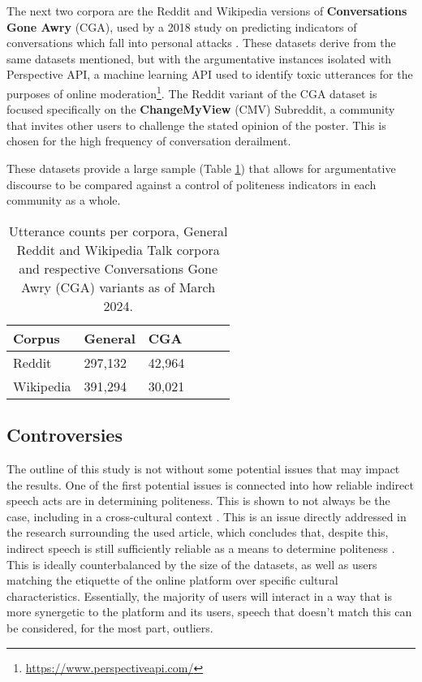 \documentclass{article}
\begin{document}
The next two corpora are the Reddit and Wikipedia versions of \textbf{Conversations Gone Awry} (CGA), used by a 2018 study on predicting indicators of conversations which fall into personal attacks \cite{CGA}. These datasets derive from the same datasets mentioned, but with the argumentative instances isolated with Perspective API, a machine learning API used to identify toxic utterances for the purposes of online moderation\footnote{\url{https://www.perspectiveapi.com/}}. The Reddit variant of the CGA dataset is focused specifically on the \textbf{ChangeMyView} (CMV) Subreddit, a community that invites other users to challenge the stated opinion of the poster. This is chosen for the high frequency of conversation derailment.

These datasets provide a large sample (Table \ref{counts}) that allows for argumentative discourse to be compared against a control of politeness indicators in each community as a whole.


\begin{table}[]
    \begin{center}
    \caption{Utterance counts per corpora, General Reddit and Wikipedia Talk corpora and respective Conversations Gone Awry (CGA) variants as of March 2024.}
    \begin{tabular}{lllllr}
    \hline
    \textbf{Corpus} & \textbf{General} & \textbf{CGA} \\
    \hline
         Reddit & 297,132 & 42,964  \\
         Wikipedia & 391,294 & 30,021 \\
    \hline
    \end{tabular}
    \label{counts}
    \end{center}
\end{table}

\subsection{Controversies}
The outline of this study is not without some potential issues that may impact the results. One of the first potential issues is connected into how reliable indirect speech acts are in determining politeness. This is shown to not always be the case, including in a cross-cultural context \cite{IAP}. This is an issue directly addressed in the research surrounding the used article, which concludes that, despite this, indirect speech is still sufficiently reliable as a means to determine politeness \cite[p. 4]{CAP}. This is ideally counterbalanced by the size of the datasets, as well as users matching the etiquette of the online platform over specific cultural characteristics. Essentially, the majority of users will interact in a way that is more synergetic to the platform and its users, speech that doesn't match this can be considered, for the most part, outliers.
\end{document}
